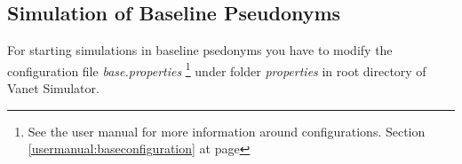 \subsection{Simulation of Baseline Pseudonyms}
For starting simulations in baseline psedonyms you have to modify the configuration file \textit{base.properties} \footnote{See the user manual for more information around configurations. Section \ref{usermanual:baseconfiguration} at page \pageref{usermanual:baseconfiguration}} under folder \textit{properties} in root directory of Vanet Simulator.\\
